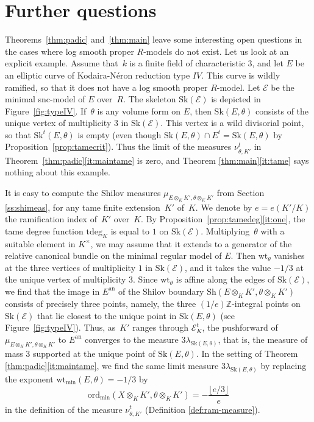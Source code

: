 \documentclass[JEP,XML,SOM,Unicode,NoFloatCountersInSection]{cedram}
\let\mathcal\mathscr
\theoremstyle{definition}
\numberwithin{equation}{subsection}
\newcommand{\Z}{\ensuremath{\mathbb{Z}}}
\newcommand{\cE}{\ensuremath{\mathscr{E}}}
\newcommand{\an}{\mathrm{an}}
\newcommand{\ord}{\mathrm{ord}}
\newcommand{\Sh}{\mathrm{Sh}}
\newcommand{\Sk}{\mathrm{Sk}}
\newcommand{\tdeg}{\mathrm{tdeg}}
\newcommand{\wt}{\mathrm{wt}}
\let\form\theta
\let\Leb\lambda
\begin{document}
\section{Further questions}
Theorems~\ref{thm:padic} and~\ref{thm:main} leave some interesting open questions in the cases where log smooth proper $R$\nobreakdash-models do not exist. Let us look at an explicit example.
Assume that~$k$ is a finite field of characteristic $3$, and let $E$ be an elliptic curve of Kodaira-Néron reduction type $IV$.
This curve is wildly ramified, so that it does not have a log smooth proper $R$\nobreakdash-model. Let $\cE$ be the minimal snc-model of $E$ over~$R$. The skeleton $\Sk(\cE)$ is depicted in Figure~\ref{fig:typeIV}. If~$\form$ is any volume form on $E$, then $\Sk(E,\form)$ consists of the unique vertex of multiplicity $3$ in $\Sk(\cE)$. This vertex is a wild divisorial point, so that $\Sk^t(E,\form)$ is empty (even though $\Sk(E,\form)\cap E^t=\Sk(E,\form)$ by Proposition~\ref{prop:tamecrit}). Thus the limit of the measures $\nu^t_{\form, K'}$ in Theorem~\ref{thm:padic}\eqref{it:maintame} is zero, and Theorem \ref{thm:main}\eqref{it:tame} says nothing about this example.

It is easy to compute the Shilov measures $\mu_{E\otimes_K K',\form\otimes_K K'}$ from Section \ref{ss:shimeas}, for any tame finite extension~$K'$ of~$K$. We denote by $e=e(K'/K)$ the ramification index of~$K'$ over~$K$. By Proposition~\ref{prop:tamedeg}\eqref{it:one}, the tame degree function $\tdeg_K$ is equal to $1$ on $\Sk(\cE)$.
Multiplying~$\form$ with a suitable element in $K^{\times}$, we may assume that it extends to a generator of the relative canonical bundle on the minimal regular model of $E$.
Then $\wt_{\form}$ vanishes at the three vertices of multiplicity $1$ in $\Sk(\cE)$, and it takes the value $-1/3$ at the unique vertex of multiplicity $3$. Since $\wt_{\form}$ is affine along the edges of $\Sk(\cE)$, we find that the image in $E^{\an}$ of the Shilov boundary $\Sh(E\otimes_K K',\form\otimes_K K')$ consists of precisely three points, namely, the three $(1/e)\Z$-integral points on $\Sk(\cE)$ that lie closest to the unique point in $\Sk(E,\form)$ (see Figure~\ref{fig:typeIV}).
Thus, as~$K'$ ranges through $\mathcal{E}^t_K$, the pushforward of $\mu_{E\otimes_K K',\form\otimes_K K'}$ to $E^{\an}$ converges to the measure $3\Leb_{\Sk(E,\form)}$, that is, the measure of mass $3$ supported at the unique point of $\Sk(E,\form)$.
In the setting of Theorem \ref{thm:padic}\eqref{it:maintame}, we find the same limit measure $3\Leb_{\Sk(E,\form)}$ by
replacing the exponent $\wt_{\min}(E,\form)=-1/3$ by\vspace*{-3pt}\enlargethispage{\baselineskip}%
\[
\ord_{\min}(X\otimes_K K',\form\otimes_K K')=-\frac{\lfloor e/3 \rfloor}{e}
\]
in the definition of the measure $\nu^t_{\form,K'}$ (Definition \ref{def:ram-measure}).
\end{document}
